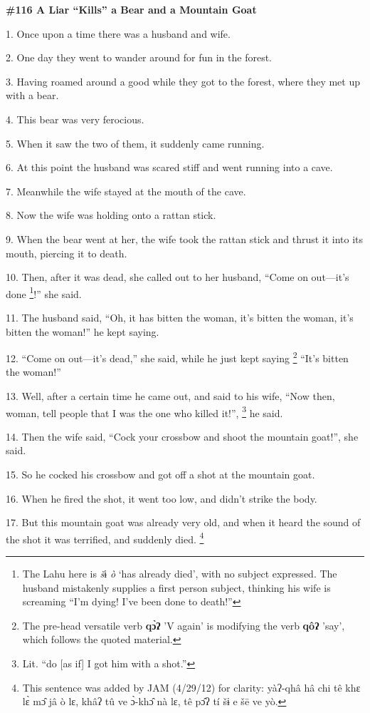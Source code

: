
\textbf{\#116 A Liar ``Kills'' a Bear and a Mountain Goat}

1. Once upon a time there was a husband and wife.

2. One day they went to wander around for fun in the forest.

3. Having roamed around a good while they got to the forest, where they met up
with a bear.

4. This bear was very ferocious.

5. When it saw the two of them, it suddenly came running.

6. At this point the husband was scared stiff and went running into a cave.

7. Meanwhile the wife stayed at the mouth of the cave.

8. Now the wife was holding onto a rattan stick.

9. When the bear went at her, the wife took the rattan stick and thrust it into
its mouth, piercing it to death.

10. Then, after it was dead, she called out to her husband, ``Come on out---it's
done \footnote{The Lahu here is \textit{š}ɨ\textit{ ò} `has already died', with no subject expressed. The husband mistakenly supplies a first person subject, thinking his wife is screaming ``I'm dying! I've been done to death!''}!'' she said.

11. The husband said, ``Oh, it has bitten the woman, it's bitten the woman, it's
bitten the woman!'' he kept saying.

12. ``Come on out---it's dead,'' she said, while he just kept saying \footnote{The pre-head versatile verb \textbf{qɔ̀ʔ}  'V again' is modifying the verb \textbf{ qôʔ}  'say', which follows the quoted material.} ``It's
bitten the woman!''

13. Well, after a certain time he came out, and said to his wife, ``Now then, woman,
tell people that I was the one who killed it!'', \footnote{Lit. ``do [as if] I got him with a shot.''} he said.

14. Then the wife said, ``Cock your crossbow and shoot the mountain goat!'', she
said.

15. So he cocked his crossbow and got off a shot at the mountain goat.

16. When he fired the shot, it went too low, and didn't strike the body.

17. But this mountain goat was already very old, and when it heard the sound of
the shot it was terrified, and suddenly died. \footnote{This sentence was added by JAM (4/29/12) for clarity:  yàʔ-qhâ hâ chi tê khɛ lɛ̀ mɔ̂ jâ ò lɛ, khâʔ tû ve ɔ̀-khɔ̂ nà lɛ, tê pɔ̂ʔ tí šɨ e šē ve yò.}

